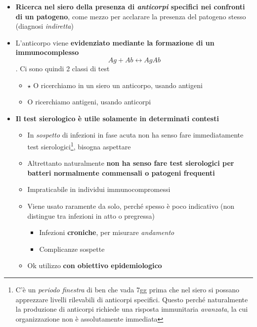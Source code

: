 \documentclass[italian,]{article}
\providecommand{\tightlist}{%
  \setlength{\itemsep}{0pt}\setlength{\parskip}{0pt}}
\newcommand{\goldstandard}{\textcircled{$\star$} }                      %
\begin{document}
\begin{itemize}
\tightlist
\item
  \textbf{Ricerca nel siero della presenza di \emph{anticorpi} specifici
  nei confronti di un patogeno}, come mezzo per acclarare la presenza
  del patogeno stesso (diagnosi \emph{indiretta})
\item
  L'anticorpo viene \textbf{evidenziato mediante la formazione di un
  immunocomplesso} \[ Ag + Ab \leftrightarrow AgAb\]. Ci sono quindi 2
  classi di test

  \begin{itemize}
  \tightlist
  \item
    \goldstandard O ricerchiamo in un siero un anticorpo, usando
    antigeni
  \item
    O ricerchiamo antigeni, usando anticorpi
  \end{itemize}
\item
  \textbf{Il test sierologico è utile solamente in determinati contesti}

  \begin{itemize}
  \tightlist
  \item
    In \emph{sospetto} di infezioni in fase acuta non ha senso fare
    immediatamente test sierologici\footnote{C'è un \emph{periodo
      finestra} di ben che vada 7gg prima che nel siero si possano
      apprezzare livelli rilevabili di anticorpi specifici. Questo
      perché naturalmente la produzione di anticorpi richiede una
      risposta immunitaria \emph{avanzata}, la cui organizzazione non è
      assolutamente immediata}, bisogna aspettare
  \item
    Altrettanto naturalmente \textbf{non ha senso fare test sierologici
    per batteri normalmente commensali o patogeni frequenti}
  \item
    Impraticabile in individui immunocompromessi
  \item
    Viene usato raramente da solo, perché spesso è poco indicativo (non
    distingue tra infezioni in atto o pregressa)

    \begin{itemize}
    \tightlist
    \item
      Infezioni \textbf{croniche}, per misurare \emph{andamento}
    \item
      Complicanze sospette
    \end{itemize}
  \item
    Ok utilizzo \textbf{con obiettivo epidemiologico}
  \end{itemize}
\end{itemize}
\end{document}
